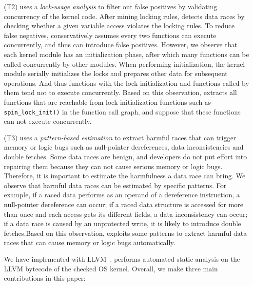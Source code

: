 (T2) \sys uses a {\em lock-usage analysis} to filter out false positives by 
validating concurrency of the kernel code. After mining locking rules, \sys 
detects data races by checking whether a given variable access violates the 
locking rules. To reduce false negatives, \sys conservatively assumes every two 
functions can execute concurrently, and thus can introduce false positives. 
However, we observe that each kernel module has an initialization phase, after 
which many functions can be called concurrently by other modules. When 
performing initialization, the kernel module serially initializes the locks and 
prepares other data for subsequent operations. And thus functions with the lock 
initialization and functions called by them tend not to execute concurrently. 
Based on this observation, \sys extracts all functions that are reachable from 
lock initialization functions such as {\tt spin\_lock\_init()} in the function 
call graph, and suppose that these functions can not execute concurrently.

(T3) \sys uses a {\em pattern-based estimation} to extract harmful races that 
can trigger memory or logic bugs such as null-pointer dereferences, data 
inconsistencies and double fetches. Some data races are benign, and developers 
do not put effort into repairing them because they can not cause serious memory 
or logic bugs. Therefore, it is important to estimate the harmfulness a data 
race can bring. We observe that harmful data races can be estimated by specific 
patterns. For example, if a raced data performs as an operand of a dereference 
instruction, a null-pointer dereference can occur; if a raced data structure is 
accessed for more than once and each access gets its different fields, a data 
inconsistency can occur; if a data race is caused by an unprotected write, it 
is likely to introduce double fetches.Based on this observation, \sys exploits 
some patterns to extract harmful data races that can cause memory or logic bugs 
automatically.

We have implemented \sys with LLVM~\cite{clang}. \sys performs automated static 
analysis on the LLVM bytecode of the checked OS kernel. Overall, we make three 
main contributions in this paper:

